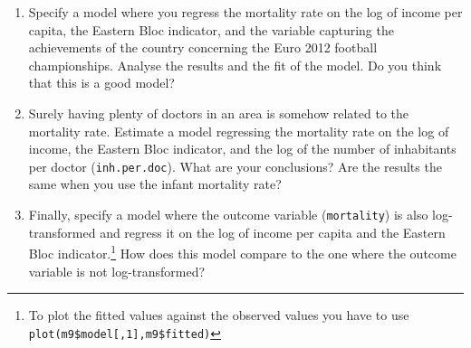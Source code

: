 \documentclass{tufte-handout}
\begin{document}
\begin{enumerate}
  \item Specify a model where you regress the mortality rate on the log of income per capita, the Eastern Bloc indicator, and the variable capturing the achievements of the country concerning the Euro 2012 football championships. 
  Analyse the results and the fit of the model. 
  Do you think that this is a good model?

  \item Surely having plenty of doctors in an area is somehow related to the mortality rate. 
  Estimate a model regressing the mortality rate on the log of income, the Eastern Bloc indicator, and the log of the number of inhabitants per doctor (\texttt{inh.per.doc}). 
  What are your conclusions? 
  Are the results the same when you use the infant mortality rate? 
  
  \item Finally, specify a model where the outcome variable (\texttt{mortality}) is also log-transformed and regress it on the log of income per capita and the Eastern Bloc indicator.\footnote{To plot the fitted values against the observed values you have to use \texttt{plot(m9\$model[,1],m9\$fitted)}} 
  How does this model compare to the one where the outcome variable is not log-transformed?
  
\end{enumerate}
\end{document}
